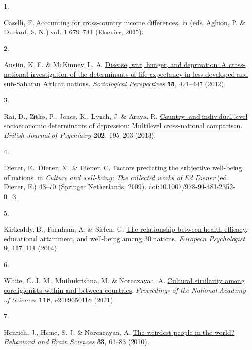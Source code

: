 \documentclass[
  man,floatsintext]{apa6}
\newlength{\cslhangindent}
\newlength{\csllabelwidth}
\newlength{\cslentryspacingunit} %
\newenvironment{CSLReferences}[2] %
 {%
  \setlength{\parindent}{0pt}
  \ifodd #1
  \let\oldpar\par
  \def\par{\hangindent=\cslhangindent\oldpar}
  \fi
  \setlength{\parskip}{#2\cslentryspacingunit}
 }%
 {}
\newcommand{\CSLLeftMargin}[1]{\parbox[t]{\csllabelwidth}{#1}}
\newcommand{\CSLRightInline}[1]{\parbox[t]{\linewidth - \csllabelwidth}{#1}\break}
\begin{document}
\begingroup

\hypertarget{refs}{}
\begin{CSLReferences}{0}{0}
\leavevmode{}%
\CSLLeftMargin{1. }%
\CSLRightInline{Caselli, F. \href{https://doi.org/10.1016/S1574-0684(05)01009-9}{Accounting for cross-country income differences}. in (eds. Aghion, P. \& Durlauf, S. N.) vol. 1 679--741 (Elsevier, 2005).}

\leavevmode{}%
\CSLLeftMargin{2. }%
\CSLRightInline{Austin, K. F. \& McKinney, L. A. \href{https://doi.org/10.1525/sop.2012.55.3.421}{Disease, war, hunger, and deprivation: A cross-national investigation of the determinants of life expectancy in less-developed and sub-{S}aharan {A}frican nations}. \emph{Sociological Perspectives} \textbf{55}, 421--447 (2012).}

\leavevmode{}%
\CSLLeftMargin{3. }%
\CSLRightInline{Rai, D., Zitko, P., Jones, K., Lynch, J. \& Araya, R. \href{https://doi.org/10.1192/bjp.bp.112.112482}{Country- and individual-level socioeconomic determinants of depression: Multilevel cross-national comparison}. \emph{British Journal of Psychiatry} \textbf{202}, 195--203 (2013).}

\leavevmode{}%
\CSLLeftMargin{4. }%
\CSLRightInline{Diener, E., Diener, M. \& Diener, C. Factors predicting the subjective well-being of nations. in \emph{Culture and well-being: The collected works of {E}d {D}iener} (ed. Diener, E.) 43--70 (Springer Netherlands, 2009). doi:\href{https://doi.org/10.1007/978-90-481-2352-0_3}{10.1007/978-90-481-2352-0\_3}.}

\leavevmode{}%
\CSLLeftMargin{5. }%
\CSLRightInline{Kirkcaldy, B., Furnham, A. \& Siefen, G. \href{https://doi.org/10.1027/1016-9040.9.2.107}{The relationship between health efficacy, educational attainment, and well-being among 30 nations}. \emph{European Psychologist} \textbf{9}, 107--119 (2004).}

\leavevmode{}%
\CSLLeftMargin{6. }%
\CSLRightInline{White, C. J. M., Muthukrishna, M. \& Norenzayan, A. \href{https://doi.org/10.1073/pnas.2109650118}{Cultural similarity among coreligionists within and between countries}. \emph{Proceedings of the National Academy of Sciences} \textbf{118}, e2109650118 (2021).}

\leavevmode{}%
\CSLLeftMargin{7. }%
\CSLRightInline{Henrich, J., Heine, S. J. \& Norenzayan, A. \href{https://doi.org/10.1017/S0140525X0999152X}{The weirdest people in the world?} \emph{Behavioral and Brain Sciences} \textbf{33}, 61--83 (2010).}


\end{CSLReferences}
\end{document}
